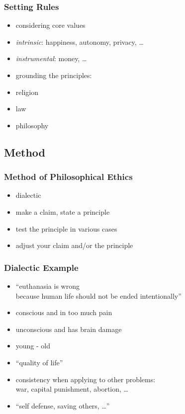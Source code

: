 \documentclass[dvipsnames]{beamer}
\theoremstyle{plain}
\begin{document}
\begin{frame}
  \frametitle{Setting Rules}

  \begin{itemize}
    \item considering \alert{core values}
    \item \emph{intrinsic}: happiness, autonomy, privacy, \ldots
    \item \emph{instrumental}: money, \ldots

    \pause
    \bigskip
    \item grounding the principles:
    \smallskip
    \item religion
    \item law
    \item philosophy
  \end{itemize}
\end{frame}

\subsection{Method}

\begin{frame}
  \frametitle{Method of Philosophical Ethics}

  \begin{itemize}
    \item \alert{dialectic}

    \medskip
    \item make a claim, state a principle
    \item test the principle in various cases
    \item adjust your claim and/or the principle
  \end{itemize}
\end{frame}

\begin{frame}
  \frametitle{Dialectic Example}

  \begin{itemize}
    \item ``euthanasia is wrong\\
      because human life should not be ended intentionally''

    \pause
    \medskip
    \item conscious and in too much pain
    \item unconscious and has brain damage
    \item young - old

    \pause
    \smallskip
    \item ``quality of life''

    \pause
    \medskip
    \item consistency when applying to other problems:\\
      war, capital punishment, abortion, \ldots
    \item ``self defense, saving others, \ldots''
  \end{itemize}
\end{frame}
\end{document}
